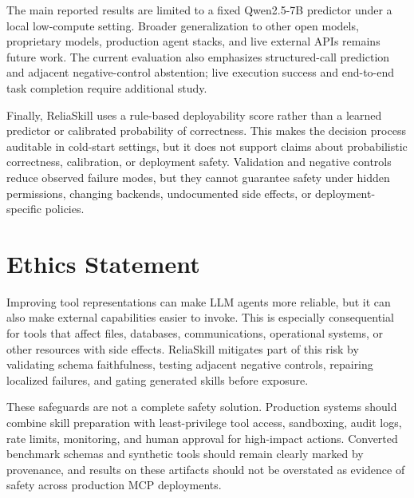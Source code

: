 \documentclass[11pt]{article}
\newcommand{\method}{ReliaSkill}
\begin{document}
The main reported results are limited to a fixed Qwen2.5-7B predictor under a local low-compute setting. Broader generalization to other open models, proprietary models, production agent stacks, and live external APIs remains future work. The current evaluation also emphasizes structured-call prediction and adjacent negative-control abstention; live execution success and end-to-end task completion require additional study.

Finally, \method{} uses a rule-based deployability score rather than a learned predictor or calibrated probability of correctness. This makes the decision process auditable in cold-start settings, but it does not support claims about probabilistic correctness, calibration, or deployment safety. Validation and negative controls reduce observed failure modes, but they cannot guarantee safety under hidden permissions, changing backends, undocumented side effects, or deployment-specific policies.

\section{Ethics Statement}
\label{sec:ethics}

Improving tool representations can make LLM agents more reliable, but it can also make external capabilities easier to invoke. This is especially consequential for tools that affect files, databases, communications, operational systems, or other resources with side effects. \method{} mitigates part of this risk by validating schema faithfulness, testing adjacent negative controls, repairing localized failures, and gating generated skills before exposure.

These safeguards are not a complete safety solution. Production systems should combine skill preparation with least-privilege tool access, sandboxing, audit logs, rate limits, monitoring, and human approval for high-impact actions. Converted benchmark schemas and synthetic tools should remain clearly marked by provenance, and results on these artifacts should not be overstated as evidence of safety across production MCP deployments.



\end{document}
